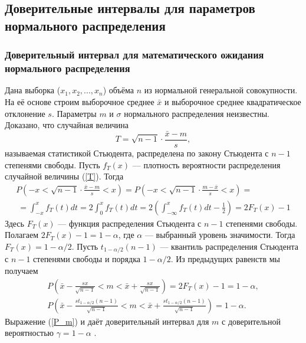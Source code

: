 \documentclass[../body.tex]{subfiles}
\begin{document}
	\subsection{Доверительные интервалы для параметров нормального распределения}
	\subsubsection{Доверительный интервал для математического ожидания нормального распределения}
	Дана выборка ($x_{1},x_{2}, ... ,x_{n}$) объёма $n$ из нормальной генеральной совокупности. На её основе строим выборочное среднее $\bar{x}$ и выборочное среднее квадратическое отклонение $s$. Параметры $m$ и $\sigma$ нормального распределения неизвестны.
	\newline
	Доказано, что случайная величина
	\begin{equation}
	T = \sqrt{n - 1}\cdot \frac{\bar{x} - m}{s},
	\label{T}
	\end{equation}
	называемая статистикой Стьюдента, распределена по закону Стьюдента с $n-1$ степенями свободы. Пусть $f_{T}(x)$ — плотность вероятности распределения случайной величины (\ref{T}). Тогда 
	\begin{multline}
		P\left(-x < \sqrt{n - 1}\cdot\frac{\bar{x} - m}{s} < x \right) = 
		P\left(-x < \sqrt{n - 1}\cdot\frac{m - \bar{x}}{s} < x \right) = \\\
		= \int_{-x}^{x}{f_{T}(t)dt} = 2 \int_{0}^{x}{f_{T}(t)dt} = 
		2\left(  \int_{-\infty}^{x}{f_{T}(t)dt} - \frac{1}{2} \right) = 2F_{T}(x) - 1
		\label{P_f_t}
	\end{multline}
	Здесь $F_{T}(x)$ — функция распределения Стьюдента с $n-1$ степенями свободы.
	\newline
	Полагаем $2F_{T}(x)-1 = 1-\alpha$, где $\alpha$ — выбранный уровень значимости. Тогда $F_{T}(x) = 1-\alpha/2$. Пусть $t_{1-\alpha/2}(n−1)$ — квантиль распределения Стьюдента с $n-1$ степенями свободы и порядка $1-\alpha/2$. Из предыдущих равенств мы получаем 
	\begin{equation}
		\begin{split}
			P\left(\bar{x} - \frac{sx}{\sqrt{n-1}} < m <  \bar{x} + \frac{sx}{\sqrt{n-1}}\right) = 2F_{T}(x) - 1 = 1 - \alpha,  \\
			P\left(\bar{x} - \frac{st_{1-\alpha/2}(n−1)}{\sqrt{n-1}} < m <  \bar{x} + \frac{st_{1-\alpha/2}(n−1)}{\sqrt{n-1}}\right)= 1 - \alpha.
			\label{P_m}
		\end{split}
	\end{equation}
	Выражение (\ref{P_m}) и даёт доверительный интервал для $m$ с доверительной вероятностью $\gamma = 1-\alpha$ \cite[c.~457-458]{max}.
	
\end{document}
